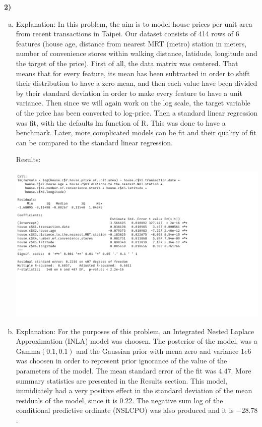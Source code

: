 \documentclass[12pt,a4paper]{article}
\begin{document}
\noindent\textbf{2)}
\begin{enumerate}[(a)]
\item
Explanation: In this problem, the aim is to model house prices per unit area from recent transactions in Taipei. Our dataset consists of 414 rows of 6 features (house age, distance from nearest MRT (metro) station in meters, number of convenience stores within walking distance, latidude, longitude and the target of the price). First of all, the data matrix was centered. That means that for every feature, its mean has been subtracted in order to shift their distribution to have a zero mean, and then each value have been divided by their standard deviation in order to make every feature to have a unit variance. Then since we will again work on the log scale, the target variable of the price has been converted to log-price. Then a standard linear regression was fit, with the defaults \textsf{lm} function of \textsf{R}. This was done to have a benchmark. Later, more complicated models can be fit and their quality of fit can be compared to the standard linear regression. 

Results:

\includegraphics[scale=0.28]{./images/2_table0.png}


\item
Explanation: For the purposes of this problem, an Integrated Nested Laplace Approximation (INLA) model was choosen. The posterior of the model, was a $\text{Gamma}(0.1,0.1)$ and the Gaussian prior with mena zero and variance $1e6$ was choosen in order to represent prior ignorance of the value of the parameters of the model. The mean standard error of the fit was $4.47$. More summary statistics are presented in the Results section. This model, immidiately had a very positive effect in the standard deviation of the mean residuals of the model, since it is $0.22$. The negative sum log of the conditional predictive ordinate (NSLCPO) was also produced and it is $-28.78$. 


\end{enumerate}
\end{document}
